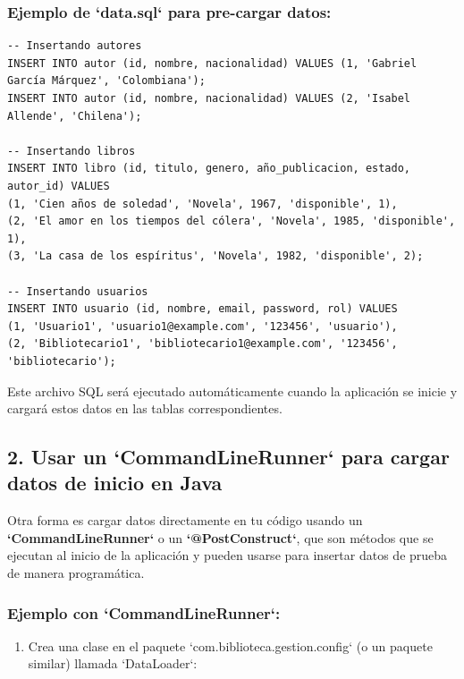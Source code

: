 \documentclass[11pt]{article}
\begin{document}
\subsubsection{Ejemplo de `data.sql` para pre-cargar datos:}
\label{sec:org9fd6faf}
\begin{verbatim}
-- Insertando autores
INSERT INTO autor (id, nombre, nacionalidad) VALUES (1, 'Gabriel García Márquez', 'Colombiana');
INSERT INTO autor (id, nombre, nacionalidad) VALUES (2, 'Isabel Allende', 'Chilena');

-- Insertando libros
INSERT INTO libro (id, titulo, genero, año_publicacion, estado, autor_id) VALUES
(1, 'Cien años de soledad', 'Novela', 1967, 'disponible', 1),
(2, 'El amor en los tiempos del cólera', 'Novela', 1985, 'disponible', 1),
(3, 'La casa de los espíritus', 'Novela', 1982, 'disponible', 2);

-- Insertando usuarios
INSERT INTO usuario (id, nombre, email, password, rol) VALUES
(1, 'Usuario1', 'usuario1@example.com', '123456', 'usuario'),
(2, 'Bibliotecario1', 'bibliotecario1@example.com', '123456', 'bibliotecario');
\end{verbatim}

Este archivo SQL será ejecutado automáticamente cuando la aplicación se inicie y cargará estos datos en las tablas correspondientes.

\subsection{2. Usar un `CommandLineRunner` para cargar datos de inicio en Java}
\label{sec:org787019f}
Otra forma es cargar datos directamente en tu código usando un \textbf{\textbf{`CommandLineRunner`}} o un \textbf{\textbf{`@PostConstruct`}}, que son métodos que se ejecutan al inicio de la aplicación y pueden usarse para insertar datos de prueba de manera programática.

\subsubsection{Ejemplo con `CommandLineRunner`:}
\label{sec:orgc54f6d3}
\begin{enumerate}
\item Crea una clase en el paquete `com.biblioteca.gestion.config` (o un paquete similar) llamada `DataLoader`:
\end{enumerate}
\end{document}
